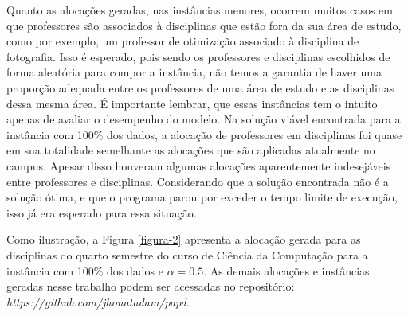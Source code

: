 Quanto as alocações geradas, nas instâncias menores, ocorrem muitos casos em que professores são associados à disciplinas que estão fora da sua área de estudo, como por exemplo, um professor de otimização associado à disciplina de fotografia. Isso é esperado, pois sendo os professores e disciplinas escolhidos de forma aleatória para compor a instância, não temos a garantia de haver uma proporção adequada entre os professores de uma área de estudo e as disciplinas dessa mesma área. É importante lembrar, que essas instâncias tem o intuito apenas de avaliar o desempenho do modelo. Na solução viável encontrada para a instância com 100\% dos dados, a alocação de professores em disciplinas foi quase em sua totalidade semelhante as alocações que são aplicadas atualmente no campus. Apesar disso houveram algumas alocações aparentemente indesejáveis entre professores e disciplinas. Considerando que a solução encontrada não é a solução ótima, e que o programa parou por exceder o tempo limite de execução, isso já era esperado para essa situação.

Como ilustração, a Figura \ref{figura-2} apresenta a alocação gerada para as disciplinas do quarto semestre do curso de Ciência da Computação para a instância com 100\% dos dados e $\alpha = 0.5$. As demais alocações e instâncias geradas nesse trabalho podem ser acessadas no repositório: \textit{https://github.com/jhonatadam/papd}.

\begin{figure}[htbp]
	\centering
\end{figure}
